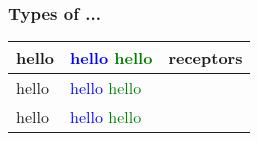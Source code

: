 \documentclass{beamer}
\begin{document}
\begin{frame}[t]
\frametitle{Types of ...}
\begin{table}
    \bfseries
    \begin{tabular}{|C{.16\textwidth}|C{.16\textwidth}|C{.28\textwidth}|}
        \hline
        hello & \textcolor{blue}{hello} \textcolor{green}{hello} & receptors\\ \hline
        hello & \textcolor{blue}{hello} \textcolor{green}{hello} & \\ \hline
        hello & \textcolor{blue}{hello} \textcolor{green}{hello} & \\ \hline
    \end{tabular}
\end{table}
\end{frame}
\end{document}
